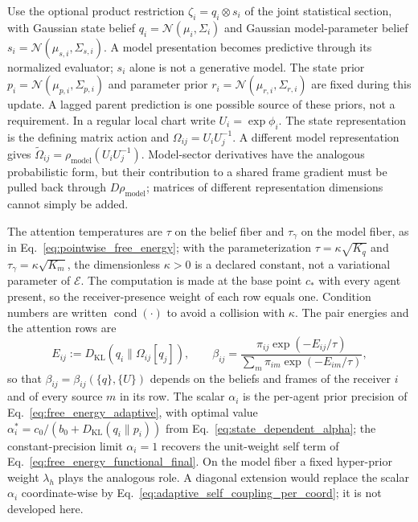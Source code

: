 Use the optional product restriction $\zeta_i=q_i\otimes s_i$ of the joint statistical section, with Gaussian state belief $q_i=\mathcal N(\mu_i,\Sigma_i)$ and Gaussian model-parameter belief $s_i=\mathcal N(\mu_{s,i},\Sigma_{s,i})$. A model presentation becomes predictive through its normalized evaluator; $s_i$ alone is not a generative model. The state prior $p_i=\mathcal N(\mu_{p,i},\Sigma_{p,i})$ and parameter prior $r_i=\mathcal N(\mu_{r,i},\Sigma_{r,i})$ are fixed during this update. A lagged parent prediction is one possible source of these priors, not a requirement. In a regular local chart write $U_i=\exp\phi_i$. The state representation is the defining matrix action and $\Omega_{ij}=U_iU_j^{-1}$. A different model representation gives $\widetilde\Omega_{ij}=\rho_{\mathrm{model}}(U_iU_j^{-1})$. Model-sector derivatives have the analogous probabilistic form, but their contribution to a shared frame gradient must be pulled back through $D\rho_{\mathrm{model}}$; matrices of different representation dimensions cannot simply be added.

The attention temperatures are $\tau$ on the belief fiber and $\tau_\gamma$ on the model fiber, as in Eq.~\eqref{eq:pointwise_free_energy}; with the parameterization $\tau = \kappa\sqrt{K_q}$ and $\tau_\gamma = \kappa\sqrt{K_m}$, the dimensionless $\kappa > 0$ is a declared constant, not a variational parameter of $\mathcal{E}$. The computation is made at the base point $c_*$ with every agent present, so the receiver-presence weight of each row equals one. Condition numbers are written $\operatorname{cond}(\cdot)$ to avoid a collision with $\kappa$. The pair energies and the attention rows are
\begin{equation}
E_{ij} := D_{\mathrm{KL}}(q_i \| \Omega_{ij}[q_j]),
\qquad
\beta_{ij} = \frac{\pi_{ij}\exp\left(-E_{ij}/\tau\right)}{\sum_m \pi_{im}\exp\left(-E_{im}/\tau\right)},
\end{equation}
so that $\beta_{ij} = \beta_{ij}(\{q\},\{U\})$ depends on the beliefs and frames of the receiver $i$ and of every source $m$ in its row. The scalar $\alpha_i$ is the per-agent prior precision of Eq.~\eqref{eq:free_energy_adaptive}, with optimal value $\alpha_i^* = c_0/(b_0 + D_{\mathrm{KL}}(q_i \| p_i))$ from Eq.~\eqref{eq:state_dependent_alpha}; the constant-precision limit $\alpha_i = 1$ recovers the unit-weight self term of Eq.~\eqref{eq:free_energy_functional_final}. On the model fiber a fixed hyper-prior weight $\lambda_h$ plays the analogous role. A diagonal extension would replace the scalar $\alpha_i$ coordinate-wise by Eq.~\eqref{eq:adaptive_self_coupling_per_coord}; it is not developed here.


